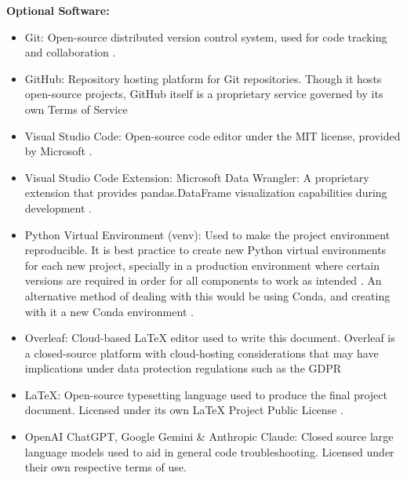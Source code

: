\documentclass[12pt]{report} %
\begin{document}
\noindent \textbf{Optional Software:}
\begin{itemize}
    \item Git: Open-source distributed version control system, used for code tracking and collaboration \cite{git}.
    
    \item GitHub: Repository hosting platform for Git repositories. Though it hosts open-source projects, GitHub itself is a proprietary service governed by its own Terms of Service \cite{github}
    
    \item Visual Studio Code: Open-source code editor under the MIT license, provided by Microsoft \cite{vscode}.
    
    \item Visual Studio Code Extension: Microsoft Data Wrangler: A proprietary extension that provides pandas.DataFrame visualization capabilities during development \cite{VSCode_DataWrangler}.

    \item Python Virtual Environment (venv): Used to make the project environment reproducible. It is best practice to create new Python virtual environments for each new project, specially in a production environment where certain versions are required in order for all components to work as intended \cite{python_venv}. An alternative method of dealing with this would be using Conda, and creating with it a new Conda environment \cite{conda}.

    \item Overleaf: Cloud-based LaTeX editor used to write this document. Overleaf is a closed-source platform with cloud-hosting considerations that may have implications under data protection regulations such as the GDPR \cite{overleaf}
    
    \item LaTeX: Open-source typesetting language used to produce the final project document. Licensed under its own LaTeX Project Public License \cite{latex}.

    \item OpenAI ChatGPT, Google Gemini \& Anthropic Claude: Closed source large language models used to aid in general code troubleshooting. Licensed under their own respective terms of use. 
\end{itemize}



\end{document}

